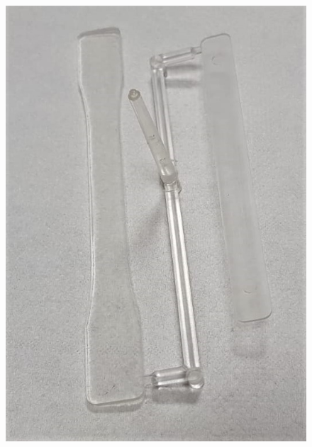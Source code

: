 \documentclass[a4paper, 11pt]{article}
\begin{document}
\begin{figure}[htp]
{\includegraphics[scale=0.25]{COC}} \qquad
\subfloat[][]

\end{figure}
\end{document}
